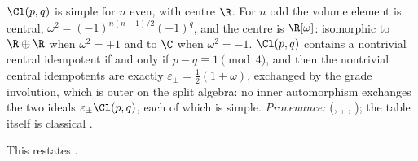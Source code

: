 $\Cl(p,q)$ is simple for $n$ even, with centre $\R$. For $n$ odd the volume element is central, $\omega^2 = (-1)^{n(n-1)/2}(-1)^q$, and the centre is $\R[\omega]$: isomorphic to $\R \oplus \R$ when $\omega^2 = +1$ and to $\C$ when $\omega^2 = -1$. $\Cl(p,q)$ contains a nontrivial central idempotent if and only if $p - q \equiv 1 \pmod 4$, and then the nontrivial central idempotents are exactly $\varepsilon_\pm = \tfrac12(1 \pm \omega)$, exchanged by the grade involution, which is outer on the split algebra: no inner automorphism exchanges the two ideals $\varepsilon_\pm \Cl(p,q)$, each of which is simple. \emph{Provenance:} \cite[Thm.~2.5, Lemmas 2.6 and 2.7, Thm.~3.6]{ButlerT1} (, , , ); the table itself is classical \cite{ABS1964, Lounesto2001}.

This restates .

